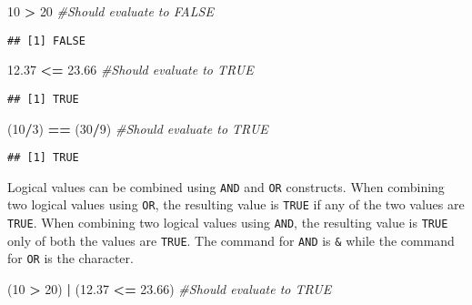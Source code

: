 \documentclass[
]{krantz}
\makeatletter
\newenvironment{Shaded}{\begin{snugshade}}{\end{snugshade}}
\newcommand{\CommentTok}[1]{\textcolor[rgb]{0.37,0.37,0.37}{\textit{#1}}}
\newcommand{\DecValTok}[1]{\textcolor[rgb]{0.06,0.06,0.06}{#1}}
\newcommand{\FloatTok}[1]{\textcolor[rgb]{0.06,0.06,0.06}{#1}}
\newcommand{\NormalTok}[1]{#1}
\newcommand{\OperatorTok}[1]{\textcolor[rgb]{0.43,0.43,0.43}{\textbf{#1}}}
\newcommand{\StringTok}[1]{\textcolor[rgb]{0.5,0.5,0.5}{#1}}
\newenvironment{kframe}{%
\medskip{}
\setlength{\fboxsep}{.8em}
 \def\at@end@of@kframe{}%
 \ifinner\ifhmode%
  \def\at@end@of@kframe{\end{minipage}}%
  \begin{minipage}{\columnwidth}%
 \fi\fi%
 \def\FrameCommand##1{\hskip\@totalleftmargin \hskip-\fboxsep
 \colorbox{shadecolor}{##1}\hskip-\fboxsep
     \hskip-\linewidth \hskip-\@totalleftmargin \hskip\columnwidth}%
 \MakeFramed {\advance\hsize-\width
   \@totalleftmargin\z@ \linewidth\hsize
   \@setminipage}}%
 {\par\unskip\endMakeFramed%
 \at@end@of@kframe}
\renewenvironment{Shaded}{\begin{kframe}}{\end{kframe}}
\makeatother
\begin{document}
\begin{Shaded}
\begin{Highlighting}[]
\DecValTok{10} \OperatorTok{>}\StringTok{ }\DecValTok{20} \CommentTok{#Should evaluate to FALSE}
\end{Highlighting}
\end{Shaded}

\begin{verbatim}
## [1] FALSE
\end{verbatim}

\begin{Shaded}
\begin{Highlighting}[]
\FloatTok{12.37} \OperatorTok{<=}\StringTok{ }\FloatTok{23.66} \CommentTok{#Should evaluate to TRUE}
\end{Highlighting}
\end{Shaded}

\begin{verbatim}
## [1] TRUE
\end{verbatim}

\begin{Shaded}
\begin{Highlighting}[]
\NormalTok{(}\DecValTok{10}\OperatorTok{/}\DecValTok{3}\NormalTok{) }\OperatorTok{==}\StringTok{ }\NormalTok{(}\DecValTok{30}\OperatorTok{/}\DecValTok{9}\NormalTok{) }\CommentTok{#Should evaluate to TRUE}
\end{Highlighting}
\end{Shaded}

\begin{verbatim}
## [1] TRUE
\end{verbatim}

Logical values can be combined using \texttt{AND} and \texttt{OR} constructs. When combining two logical values using \texttt{OR}, the resulting value is \texttt{TRUE} if any of the two values are \texttt{TRUE}. When combining two logical values using \texttt{AND}, the resulting value is \texttt{TRUE} only of both the values are \texttt{TRUE}. The command for \texttt{AND} is \texttt{\&} while the command for \texttt{OR} is the \texttt{\textbar{}} character.

\begin{Shaded}
\begin{Highlighting}[]
\NormalTok{(}\DecValTok{10} \OperatorTok{>}\StringTok{ }\DecValTok{20}\NormalTok{) }\OperatorTok{|}\StringTok{ }\NormalTok{(}\FloatTok{12.37} \OperatorTok{<=}\StringTok{ }\FloatTok{23.66}\NormalTok{) }\CommentTok{#Should evaluate to TRUE}
\end{Highlighting}
\end{Shaded}
\end{document}
